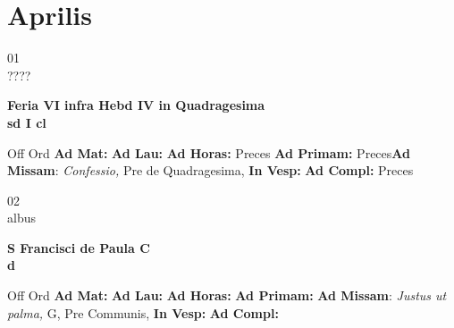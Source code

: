 \documentclass[10pt, openany]{book}
\begin{document}
    \chapter{Aprilis}
                    
    \begin{center}
        \begin{minipage}{3.5in}
            \vspace{2em}
            \begin{minipage}{0.5in}
                {\Huge 01} \\
                {\normalsize ????}
            \end{minipage}
            \begin{minipage}{3.0in}
                \textbf{ \large Feria VI infra Hebd IV in Quadragesima  \\
                \textnormal{\normalsize sd I cl}}

            \end{minipage}
            \begin{justify}Off Ord
                \textbf{Ad Mat: }
                \textbf{Ad Lau: }
                \textbf{Ad Horas: }Preces
                \textbf{Ad Primam: }Preces\textbf{Ad Missam}: \textit{Confessio,} Pre de Quadragesima, 
                \textbf{In Vesp: }
                \textbf{Ad Compl: }Preces
            \end{justify}
        \end{minipage}
    \end{center}

    \begin{center}
        \begin{minipage}{3.5in}
            \vspace{2em}
            \begin{minipage}{0.5in}
                {\Huge 02} \\
                {\normalsize albus}
            \end{minipage}
            \begin{minipage}{3.0in}
                \textbf{ \large S Francisci de Paula C \\
                \textnormal{\normalsize d}}

            \end{minipage}
            \begin{justify}Off Ord
                \textbf{Ad Mat: }
                \textbf{Ad Lau: }
                \textbf{Ad Horas: }
                \textbf{Ad Primam: }\textbf{Ad Missam}: \textit{Justus ut palma,} G, Pre Communis, 
                \textbf{In Vesp: }
                \textbf{Ad Compl: }
            \end{justify}
        \end{minipage}
    \end{center}
\end{document}
